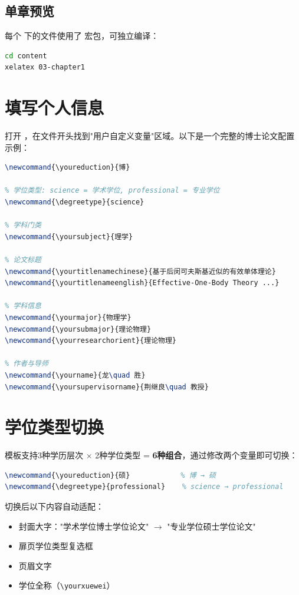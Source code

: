 \documentclass[../main-manual.tex]{subfiles}
\begin{document}
\subsection{单章预览}

每个  下的文件使用了  宏包，可独立编译：

\begin{lstlisting}[language=bash, caption={独立编译第三章}]
cd content
xelatex 03-chapter1
\end{lstlisting}

\section{填写个人信息}

打开 ，在文件开头找到"用户自定义变量"区域。以下是一个完整的博士论文配置示例：

\begin{lstlisting}[language=TeX, caption={个人信息配置示例}]
% 学历层次: 博 / 硕 / 学（本科）
\newcommand{\youreduction}{博}

% 学位类型: science = 学术学位, professional = 专业学位
\newcommand{\degreetype}{science}

% 学科门类
\newcommand{\yoursubject}{理学}

% 论文标题
\newcommand{\yourtitlenamechinese}{基于后闵可夫斯基近似的有效单体理论}
\newcommand{\yourtitlenameenglish}{Effective-One-Body Theory ...}

% 学科信息
\newcommand{\yourmajor}{物理学}
\newcommand{\yoursubmajor}{理论物理}
\newcommand{\yourresearchorient}{理论物理}

% 作者与导师
\newcommand{\yourname}{龙\quad 胜}
\newcommand{\yoursupervisorname}{荆继良\quad 教授}
\end{lstlisting}

\section{学位类型切换}

模板支持3种学历层次 × 2种学位类型 = \textbf{6种组合}，通过修改两个变量即可切换：

\begin{lstlisting}[language=TeX, caption={切换至硕士专业学位}]
\newcommand{\youreduction}{硕}            % 博 → 硕
\newcommand{\degreetype}{professional}    % science → professional
\end{lstlisting}

切换后以下内容自动适配：
\begin{itemize}
	\item 封面大字："学术学位博士学位论文" $\to$ "专业学位硕士学位论文"
	\item 扉页学位类型复选框
	\item 页眉文字
	\item 学位全称（\verb|\yourxuewei|）
\end{itemize}
\end{document}

